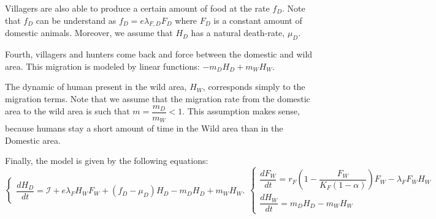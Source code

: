 \documentclass{article}
\newcommand{\lfw}{\lambda_{F}}
\newcommand{\lfd}{\lambda_{F, D}}
\newcommand{\lfw}{\lambda_{F}}
\newcommand{\cI}{\mathcal{I}}
\begin{document}
Villagers are also able to produce a certain amount of food at the rate $f_D$. Note that $f_D$ can be understand as $f_D = e \lfd F_D$ where $F_D$ is a constant amount of domestic animals.
Moreover, we assume that $H_D$ has a natural death-rate, $\mu_D$.

Fourth, villagers and hunters come back and force between the domestic and wild area. This migration is modeled by linear functions: $-m_D H_D + m_W H_W$.

The dynamic of human present in the wild area, $H_W$, corresponds simply to the migration terms. Note that we assume that the migration rate from the domestic area to the wild area is such that $m = \dfrac{m_D}{m_W} < 1$. This assumption makes sense, because humans stay a short amount of time in the Wild area than in the Domestic area.

Finally, the model is given by the following equations:
\begin{subequations}
\begin{equation}
\left\{ \begin{array}{l}
\dfrac{dH_D}{dt}= \cI + e\lfw H_W F_W + (f_D - \mu_D) H_D - m_D H_D + m_W H_W.
\end{array}\right.
\end{equation}
\begin{equation}
\left\lbrace \begin{array}{l}
\dfrac{dF_W}{dt} = r_F \left(1 - \dfrac{F_W}{K_F(1-\alpha)} \right) F_W - \lfw F_W H_W \\
\dfrac{dH_W}{dt}= m_D H_D - m_W H_W 
\end{array} \right.
\end{equation}
\label{equationsHDFWHW}
\end{subequations}
\end{document}
